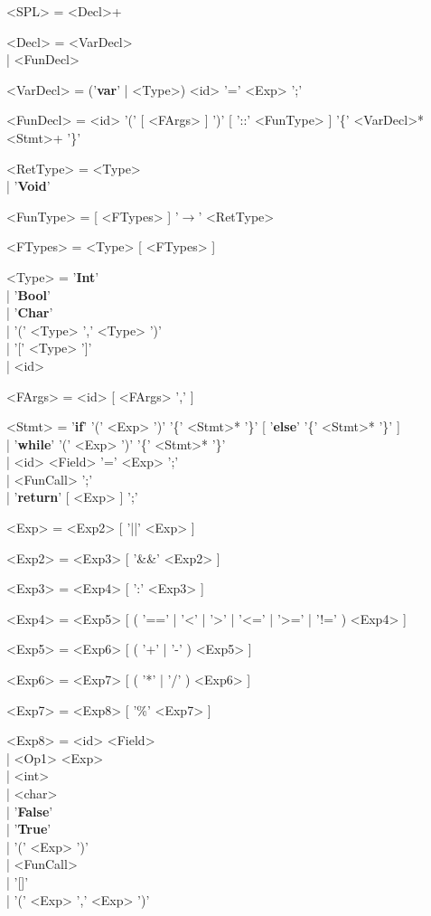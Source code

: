 \documentclass{article}
\begin{document}
\begin{grammar}
<SPL> = <Decl>+

<Decl> = <VarDecl> \\| <FunDecl>

<VarDecl> = ('\textbf{var}' | <Type>) <id> '=' <Exp> ';'

<FunDecl> = <id> '(' [ <FArgs> ] ')' [ '::' <FunType> ] '\{' <VarDecl>* <Stmt>+ '\}'

<RetType> = <Type> \\| '\textbf{Void}'

<FunType> = [ <FTypes> ] '$\rightarrow$' <RetType>

<FTypes> = <Type> [ <FTypes> ]

<Type> = '\textbf{Int}' \\| '\textbf{Bool}' \\| '\textbf{Char}' \\| '(' <Type> ',' <Type> ')' \\| '[' <Type> ']' \\| <id>

<FArgs> = <id> [ <FArgs> ',' ]

<Stmt> = '\textbf{if}' '(' <Exp> ')' '\{' <Stmt>* '\}' [ '\textbf{else}' '\{' <Stmt>* '\}' ] \\| '\textbf{while}' '(' <Exp> ')' '\{' <Stmt>* '\}' \\| <id> <Field> '=' <Exp> ';' \\| <FunCall> ';' \\| '\textbf{return}' [ <Exp> ] ';'

<Exp> = <Exp2> [ '||' <Exp> ]

<Exp2> = <Exp3> [ '\&\&' <Exp2> ]

<Exp3> = <Exp4> [ ':' <Exp3> ]

<Exp4> = <Exp5> [ ( '==' | '\textless' | '\textgreater' | '\textless=' | '\textgreater=' | '!=' ) <Exp4> ]

<Exp5> = <Exp6> [ ( '+' | '-' ) <Exp5> ]

<Exp6> = <Exp7> [ ( '*' | '/' ) <Exp6> ]

<Exp7> = <Exp8> [ '\%' <Exp7> ]

<Exp8> = <id> <Field> \\| <Op1> <Exp> \\| <int> \\| <char> \\| '\textbf{False}' \\| '\textbf{True}' \\| '(' <Exp> ')' \\| <FunCall> \\| '[]' \\| '(' <Exp> ',' <Exp> ')'


\end{grammar}
\end{document}
